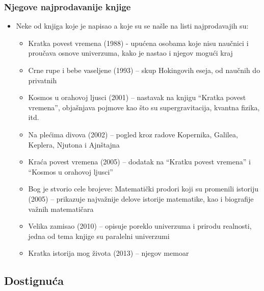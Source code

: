 \documentclass{beamer}
\begin{document}
\begin{frame}[fragile]\frametitle{ Njegove najprodavanije knjige}
	\begin{itemize}	\fontsize{9}{6}\selectfont	
		\item Neke od knjiga koje je napisao a koje su se našle na listi najprodavajih su:
		\begin{itemize}\fontsize{9}{6}\selectfont
 \item Kratka povest vremena (1988) - upućena osobama koje nisu naučnici i proučava osnove univerzuma, kako je nastao i njegov mogući kraj
 \item Crne rupe i bebe vaseljene (1993) – skup Hokingovih eseja, od naučnih do privatnih
 \item Kosmos u orahovoj ljusci (2001) – nastavak na knjigu “Kratka povest vremena”, objašnjava pojmove kao što su supergravitacija, kvantna fizika, itd.
 \item Na plećima divova (2002) – pogled kroz radove Kopernika, Galilea, Keplera, Njutona i Ajnštajna
 \item Kraća povest vremena (2005) – dodatak na “Kratku povest vremena” i “Kosmos u orahovoj ljusci”
 \item Bog je stvorio cele brojeve: Matematički prodori koji su promenili istoriju (2005) –  prikazuje najvažnije delove istorije matematike, kao i biografije važnih matematičara
 \item Velika zamisao (2010) – opisuje poreklo univerzuma i prirodu realnosti, jedna od tema knjige su paralelni univerzumi
 \item Kratka istorija mog života (2013) – njegov memoar
\end{itemize}
\end{itemize}
\end{frame}	
	\subsection{Dostignuća}
	
\end{document}
